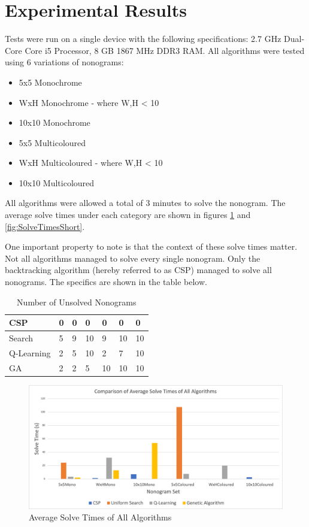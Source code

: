 \documentclass{svproc}
\begin{document}
\section{Experimental Results}
Tests were run on a single device with the following specifications: 2.7 GHz Dual-Core Core i5 Processor, 8 GB 1867 MHz DDR3 RAM.
	All algorithms were tested using 6 variations of nonograms:
	\begin{itemize}
	    \item 5x5 Monochrome
	    \item WxH Monochrome - where W,H < 10
	    \item 10x10 Monochrome
	    \item 5x5 Multicoloured
	    \item WxH Multicoloured - where W,H < 10
	    \item 10x10 Multicoloured
	\end{itemize}
\noindent All algorithms were allowed a total of 3 minutes to solve the nonogram.
The average solve times under each category are shown in figures \ref{fig:SolveTimes} and \ref{fig:SolveTimesShort}.

One important property to note is that the context of these solve  times matter.
Not all algorithms managed to solve every single nonogram.
Only the backtracking algorithm (hereby referred to as CSP) managed to solve all nonograms.
The specifics are shown in the table below.
\begin{table}[h]
    \centering
    \begin{tabularx}{\textwidth}{|m{}||m{}|m{}|m{}|m{}|m{}|m{}|}
        \hline
         CSP & 0 & 0 & 0 & 0 & 0 & 0 \\
         \hline
         Search & 5 & 9 & 10 & 9 & 10 & 10 \\
         \hline
         Q-Learning & 2 & 5 & 10 & 2 & 7 & 10 \\
         \hline
         GA & 2 & 2 & 5 & 10 & 10 & 10 \\
         \hline
    \end{tabularx}
    \caption{Number of Unsolved Nonograms}
    \label{tab:UnsolvedTable}
\end{table}

\begin{figure}[h]
    \centering
    \includegraphics[width=\textwidth]{SolveTimes.png}
    \caption{Average Solve Times of All Algorithms}
    \label{fig:SolveTimes}
\end{figure}
\end{document}
